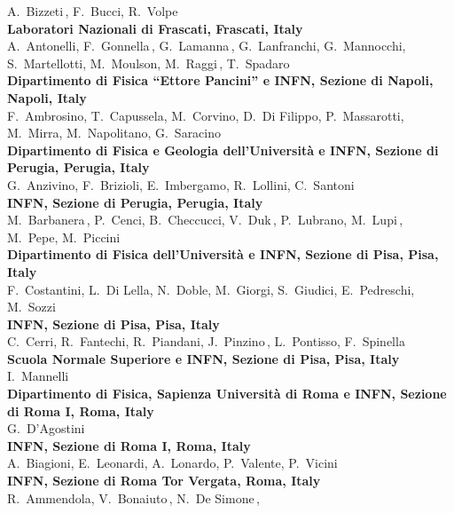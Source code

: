 \begin{raggedright}
 A.~Bizzeti$\,$\footnotemark[8],
 F.~Bucci,
 R.~Volpe\\[2mm]
{\bf Laboratori Nazionali di Frascati, Frascati, Italy}\\
 A.~Antonelli,
 F.~Gonnella$\,$\footnotemark[9],
 G.~Lamanna$\,$\footnotemark[10],
 G.~Lanfranchi,
 G.~Mannocchi,
 S.~Martellotti,
 M.~Moulson,
 M.~Raggi$\,$\footnotemark[11],
 T.~Spadaro\\[2mm]
{\bf Dipartimento di Fisica ``Ettore Pancini'' e INFN, Sezione di Napoli, Napoli, Italy}\\
 F.~Ambrosino,
 T.~Capussela,
 M.~Corvino,
 D.~Di Filippo,
 P.~Massarotti,
 M.~Mirra,
 M.~Napolitano,
 G.~Saracino\\[2mm]
{\bf Dipartimento di Fisica e Geologia dell'Universit\`a e INFN, Sezione di Perugia, Perugia, Italy}\\
 G.~Anzivino,
 F.~Brizioli,
 E.~Imbergamo,
 R.~Lollini,
 C.~Santoni\\[2mm]
{\bf INFN, Sezione di Perugia, Perugia, Italy}\\
 M.~Barbanera$\,$\footnotemark[12],
 P.~Cenci,
 B.~Checcucci,
 V.~Duk$\,$\footnotemark[9],
 P.~Lubrano,
 M.~Lupi$\,$\footnotemark[7],
 M.~Pepe,
 M.~Piccini\\[2mm]
{\bf Dipartimento di Fisica dell'Universit\`a e INFN, Sezione di Pisa, Pisa, Italy}\\
 F.~Costantini,
 L.~Di Lella,
 N.~Doble,
 M.~Giorgi,
 S.~Giudici,
 E.~Pedreschi,
 M.~Sozzi\\[2mm]
{\bf INFN, Sezione di Pisa, Pisa, Italy}\\
 C.~Cerri,
 R.~Fantechi,
 R.~Piandani,
 J.~Pinzino$\,$\footnotemark[7],
 L.~Pontisso,
 F.~Spinella\\[2mm]
{\bf Scuola Normale Superiore e INFN, Sezione di Pisa, Pisa, Italy}\\
 I.~Mannelli\\[2mm]
{\bf Dipartimento di Fisica, Sapienza Universit\`a di Roma e INFN, Sezione di Roma I, Roma, Italy}\\
 G.~D'Agostini\\[2mm]
{\bf INFN, Sezione di Roma I, Roma, Italy}\\
 A.~Biagioni,
 E.~Leonardi,
 A.~Lonardo,
 P.~Valente,
 P.~Vicini\\[2mm]
{\bf INFN, Sezione di Roma Tor Vergata, Roma, Italy}\\
 R.~Ammendola,
 V.~Bonaiuto$\,$\footnotemark[13],
 N.~De Simone$\,$\footnotemark[7],

\end{raggedright}
